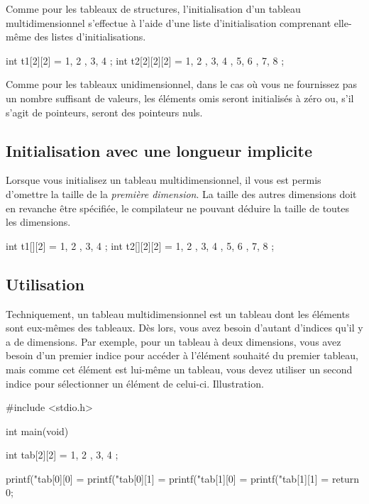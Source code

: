 Comme pour les tableaux de structures, l'initialisation d'un tableau
multidimensionnel s'effectue à l'aide d'une liste d'initialisation
comprenant elle-même des listes d'initialisations.

\begin{C}
int t1[2][2] = { { 1, 2 }, { 3, 4 } };
int t2[2][2][2] = { { { 1, 2 }, { 3, 4 } }, { { 5, 6 }, { 7, 8 } } };
\end{C}

\begin{attentionbox}
 Comme pour les tableaux
unidimensionnel, dans le cas où vous ne fournissez pas un nombre
suffisant de valeurs, les éléments omis seront initialisés à zéro ou,
s'il s'agit de pointeurs, seront des pointeurs nuls.
\end{attentionbox}


\subsection{Initialisation avec une longueur implicite}
\label{initialisation-avec-une-longueur-implicite-2}

Lorsque vous initialisez un tableau multidimensionnel, il vous est
permis d'omettre la taille de la \emph{première dimension}. La taille
des autres dimensions doit en revanche être spécifiée, le compilateur ne
pouvant déduire la taille de toutes les dimensions.

\begin{C}
int t1[][2] = { { 1, 2 }, { 3, 4 } };
int t2[][2][2] = { { { 1, 2 }, { 3, 4 } }, { { 5, 6 }, { 7, 8 } } };
\end{C}

\subsection{Utilisation}
\label{utilisation-4}

Techniquement, un tableau multidimensionnel est un tableau dont les
éléments sont eux-mêmes des tableaux. Dès lors, vous avez besoin
d'autant d'indices qu'il y a de dimensions. Par exemple, pour un tableau
à deux dimensions, vous avez besoin d'un premier indice pour accéder à
l'élément souhaité du premier tableau, mais comme cet élément est
lui-même un tableau, vous devez utiliser un second indice pour
sélectionner un élément de celui-ci. Illustration.

\begin{C}
#include <stdio.h>


int main(void)
{
    int tab[2][2] = { { 1, 2 }, { 3, 4 } };

    printf("tab[0][0] = %
    printf("tab[0][1] = %
    printf("tab[1][0] = %
    printf("tab[1][1] = %
    return 0;
}
\end{C}

